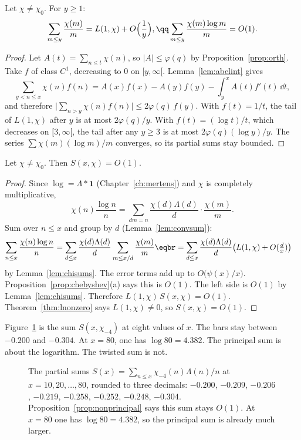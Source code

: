 \begin{lemma}\label{lem:chisums}
Let $\chi\ne\chi_0$. For $y\ge1$:
\[
\begin{gathered}\sum_{m\le y}\frac{\chi(m)}m=L(1,\chi)+O\Bigl(\frac1y\Bigr),\qq\sum_{m\le y}\frac{\chi(m)\log m}m=O(1).\end{gathered}
\]
\end{lemma}
\begin{proof}
Let $A(t)=\sum_{n\le t}\chi(n)$, so $|A|\le\varphi(q)$ by Proposition~\ref{prop:orth}. Take $f$ of class $C^1$, decreasing to $0$ on $[y,\infty[$. Lemma~\ref{lem:abelint} gives
\[
\sum_{y<n\le x}\chi(n)f(n)=A(x)f(x)-A(y)f(y)-\int_y^x A(t)f'(t)\,\dd t,
\]
and therefore $\bigl|\sum_{n>y}\chi(n)f(n)\bigr|\le 2\varphi(q)\,f(y)$. With $f(t)=1/t$, the tail of $L(1,\chi)$ after $y$ is at most $2\varphi(q)/y$. With $f(t)=(\log t)/t$, which decreases on $[3,\infty[$, the tail after any $y\ge3$ is at most $2\varphi(q)(\log y)/y$. The series $\sum\chi(m)(\log m)/m$ converges, so its partial sums stay bounded.
\end{proof}

\begin{proposition}\label{prop:nonprincipal}
Let $\chi\ne\chi_0$. Then $S(x,\chi)=O(1)$.
\end{proposition}
\begin{proof}
Since $\log=\Lambda*\mathbf1$ (Chapter~\ref{ch:mertens}) and $\chi$ is completely multiplicative,
\[
\chi(n)\frac{\log n}n=\sum_{dm=n}\frac{\chi(d)\Lambda(d)}d\cdot\frac{\chi(m)}m.
\]
Sum over $n\le x$ and group by $d$ (Lemma~\ref{lem:convsum}):
\[
\begin{aligned}\sum_{n\le x}\frac{\chi(n)\log n}n&=\sum_{d\le x}\frac{\chi(d)\Lambda(d)}d\sum_{m\le x/d}\frac{\chi(m)}m\eqbr=\sum_{d\le x}\frac{\chi(d)\Lambda(d)}d\bigl(L(1,\chi)+O(\tfrac dx)\bigr)\end{aligned}
\]
by Lemma~\ref{lem:chisums}. The error terms add up to $O\bigl(\psi(x)/x\bigr)$. Proposition~\ref{prop:chebyshev}(a) says this is $O(1)$. The left side is $O(1)$ by Lemma~\ref{lem:chisums}. Therefore $L(1,\chi)\,S(x,\chi)=O(1)$. Theorem~\ref{thm:lnonzero} says $L(1,\chi)\ne0$, so $S(x,\chi)=O(1)$.
\end{proof}

Figure~\ref{fig:twistedbars} is the sum $S(x,\chi_{-4})$ at eight values of $x$. The bars stay between $-0.200$ and $-0.304$. At $x=80$, one has $\log 80=4.382$. The principal sum is about the logarithm. The twisted sum is not.

\begin{figure}[ht]
\centering
{}
\caption{The partial sums $S(x)=\sum_{n\le x}\chi_{-4}(n)\Lambda(n)/n$ at $x=10,20,\dots,80$, rounded to three decimals: $-0.200$, $-0.209$, $-0.206$, $-0.219$, $-0.258$, $-0.252$, $-0.248$, $-0.304$. Proposition~\ref{prop:nonprincipal} says this sum stays $O(1)$. At $x=80$ one has $\log 80=4.382$, so the principal sum is already much larger.}
\label{fig:twistedbars}
\end{figure}

